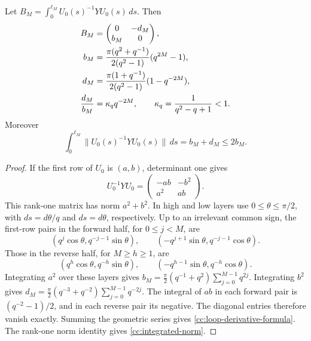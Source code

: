 \begin{lemma}
\label{cc:loop-derivative}
Let $B_M=\int_0^{\ell_M}U_0(s)^{-1}YU_0(s)\,ds$. Then
\begin{align}
 B_M&=\begin{pmatrix}0&-d_M\\b_M&0\end{pmatrix},\notag\\
 b_M&=\frac{\pi(q^2+q^{-1})}{2(q^2-1)}(q^{2M}-1),\notag\\
 d_M&=\frac{\pi(1+q^{-1})}{2(q^2-1)}(1-q^{-2M}),\notag\\
 \frac{d_M}{b_M}&=\kappa_q q^{-2M},\qquad
 \kappa_q=\frac1{q^2-q+1}<1. \label{cc:loop-derivative-formula}
\end{align}
Moreover
\begin{equation}\label{cc:integrated-norm}
 \int_0^{\ell_M}\|U_0(s)^{-1}YU_0(s)\|\,ds
       =b_M+d_M\leq2b_M .
\end{equation}
\end{lemma}
\begin{proof}
If the first row of $U_0$ is $(a,b)$, determinant one gives
\begin{equation}\label{cc:conjugated-y}
 U_0^{-1}YU_0=
 \begin{pmatrix}-ab&-b^2\\a^2&ab\end{pmatrix}.
\end{equation}
This rank-one matrix has norm $a^2+b^2$. In high and low layers
use $0\leq\theta\leq\pi/2$, with $ds=d\theta/q$ and
$ds=d\theta$, respectively. Up to an irrelevant common sign,
the first-row pairs in the forward half, for $0\leq j<M$, are
\begin{equation}\label{cc:forward-rows}
 (q^j\cos\theta,q^{-j-1}\sin\theta),\qquad
 (-q^{j+1}\sin\theta,q^{-j-1}\cos\theta).
\end{equation}
Those in the reverse half, for $M\geq h\geq1$, are
\begin{equation}\label{cc:reverse-rows}
 (q^h\cos\theta,q^{-h}\sin\theta),\qquad
 (-q^{h-1}\sin\theta,q^{-h}\cos\theta).
\end{equation}
Integrating $a^2$ over these layers gives
$b_M=\frac{\pi}{2}(q^{-1}+q^2)\sum_{j=0}^{M-1}q^{2j}$.
Integrating $b^2$ gives
$d_M=\frac{\pi}{2}(q^{-3}+q^{-2})\sum_{j=0}^{M-1}q^{-2j}$.
The integral of $ab$ in each forward pair is
$(q^{-2}-1)/2$, and in each reverse pair its negative.
The diagonal entries therefore vanish exactly. Summing the
geometric series gives \eqref{cc:loop-derivative-formula}.
The rank-one norm identity gives \eqref{cc:integrated-norm}.
\end{proof}

